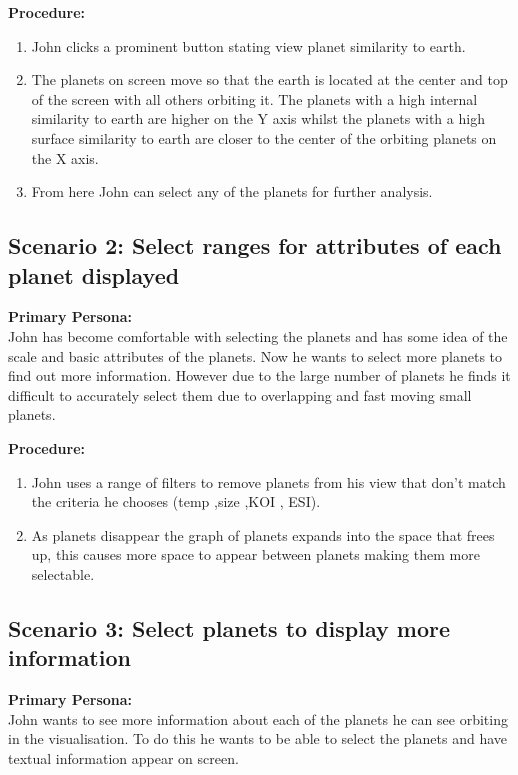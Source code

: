 {\bf Procedure:}
 \begin{enumerate}
 \item John clicks a prominent button stating view planet similarity to earth.
 \item The planets on screen move so that the earth is located at the center and
top of the screen with all others orbiting it. The planets with a high internal
similarity to earth are higher on the Y axis whilst the planets with a high
surface similarity to earth are closer to the center of the orbiting planets on
the X axis.
 \item From here John can select any of the planets for further analysis.
 \end{enumerate}
 \subsection{Scenario 2: Select ranges for attributes of each planet displayed}
   {\bf Primary Persona:}\\
 John has become comfortable with selecting the planets and has some idea of the
scale and basic attributes of the planets. Now he wants to select more planets
to find out more information. However due to the large number of planets he
finds it difficult to accurately select them due to overlapping and fast moving
small planets.
 
  {\bf Procedure:}
  \begin{enumerate}
 \item John uses a range of filters to remove planets from his view that don't
match the criteria he chooses (temp ,size ,KOI , ESI).
\item As planets disappear the graph of planets expands into the space that
frees up, this causes more space to appear between planets making them more
selectable.
 \end{enumerate}
 \subsection{Scenario 3: Select planets to display more information}
  {\bf  Primary Persona:}\\
 John wants to see more information about each of the planets he can see
orbiting in the visualisation. To do this he wants to be able to select the
planets and have textual information appear on screen.
 
